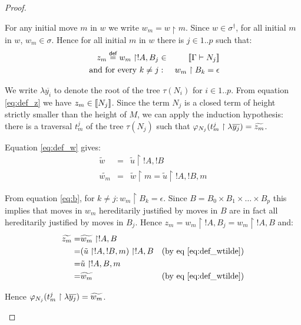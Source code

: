 \begin{proof}
\begin{itemize}
    For any initial move $m$ in $w$ we write $w_m = w \upharpoonright
    m$. Since $w \in \sigma^\dagger$, for all initial $m$ in $w$, $w_m \in \sigma$. Hence for
    all initial $m$ in $w$ there is $j \in 1..p$ such that:
    \begin{eqnarray}
        z_m \stackrel{\textsf{def}}{=} w_m \upharpoonright !A, B_j &\in& {[\![ \Gamma \vdash N_j ]\!]}  \label{eq:def_z} \\
        \mbox{ and for every } k\neq j &:& w_m \upharpoonright B_k = \epsilon \label{eq:b}
    \end{eqnarray}

    We write $\lambda \overline{y_i}$ to denote the root of the tree $\tau(N_i)$ for $i \in 1..p$.
    From equation \ref{eq:def_z} we have $z_m \in {[\![N_j ]\!]}$. Since the term $N_j$ is a closed term of height strictly smaller than the height
    of $M$, we can apply the induction hypothesis:
    there is a traversal $t^j_m$ of the tree $\tau(N_j)$
    such that $\varphi_{N_j}(t^j_m \upharpoonright \lambda \overline{y_j} ) = \widetilde{z_m}$.



    Equation \ref{eq:def_w} gives:
    \begin{eqnarray}
        \tilde{w} &=& \tilde{u} \upharpoonright !A,!B  \nonumber \\
        \widetilde{w_m} &=& \tilde{w}\upharpoonright m  = \tilde{u} \upharpoonright !A,!B,m
        \label{eq:def_wtilde}
    \end{eqnarray}

    From equation \ref{eq:b}, for $k\neq j : w_m \upharpoonright B_k = \epsilon$. Since $B =
    B_0 \times B_1 \times \ldots \times B_p$ this implies that moves in $w_m$ hereditarily justified by moves in $B$ are in fact all
    hereditarily justified by moves in $B_j$.  Hence $z_m = w_m \upharpoonright !A, B_j = w_m \upharpoonright !A, B$ and:
    \begin{eqnarray*}
            \widetilde{z_m} =& \widetilde{w_m} \upharpoonright !A,B \\
            =& (\tilde{u} \upharpoonright !A,!B,m) \upharpoonright !A,B &\mbox{(by eq \ref{eq:def_wtilde})} \\
            =& \tilde{u} \upharpoonright !A,B,m \\
            =& \widetilde{w_m}  & \mbox{(by eq \ref{eq:def_wtilde})}
    \end{eqnarray*}


    Hence $\varphi_{N_j}(t^j_m \upharpoonright \lambda \overline{y_j} ) = \widetilde{w_m}$.






\end{itemize}
\end{proof}
